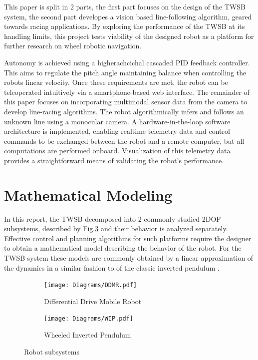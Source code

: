     This paper is split in 2 parts, the first part focuses on the design of the TWSB system, the second part
    developes a vision based line-following algorithm, geared towards racing applications. By exploring 
    the performance of the TWSB at its handling limits, this project tests viability of the designed robot
    as a platform for further research on wheel robotic navigation. 
   
    Autonomy is achieved using a higherachcichal cascaded PID feedback controller. This aims 
    to regulate the pitch angle maintaining balance when controlling the robots linear velocity. 
    Once these requirements are met, the robot can be teleoperated intuitively via a 
    smartphone-based web interface. The remainder of this paper focuses on incorporating 
    multimodal sensor data from the camera to develop line-racing algorithms.
    The robot algorithmically infers and follows an unknown line using a monocular camera. 
    A hardware-in-the-loop software architecture is implemented, enabling realtime telemetry data and control 
    commands to be exchanged between the robot and a remote computer, but all computations are performed onboard. 
    Visualization of this telemetry data provides a straightforward means of validating the robot's performance.


    \section{Mathematical Modeling} %
    In this report, the TWSB decomposed into 2 commonly studied 2DOF subsystems, described by Fig.\ref{fig:2DOF} and their behavior is analyzed
    separately.
    Effective control and planning algorithms for such platforms require the designer to obtain a mathematical model describing the behavior
    of the robot.  
    For the TWSB system these models are commonly obtained by a linear approximation of the dynamics in a similar fashion to 
    of the classic inverted pendulum \cite{AdvancedWIP}.
    \begin{figure}[h]
        \centering
        \begin{subfigure}[b]{0.4\textwidth}
            \texttt{[image: Diagrams/DDMR.pdf]}
            \caption{Differential Drive Mobile Robot}
            \label{fig:DDMR}
        \end{subfigure}
        \hfill
        \begin{subfigure}[b]{0.4\textwidth}
            \texttt{[image: Diagrams/WIP.pdf]}
            \caption{Wheeled Inverted Pendulum}
            \label{fig:WIP}
        \end{subfigure}        
        \caption{Robot subsystems}
        \label{fig:2DOF}
    \end{figure}


